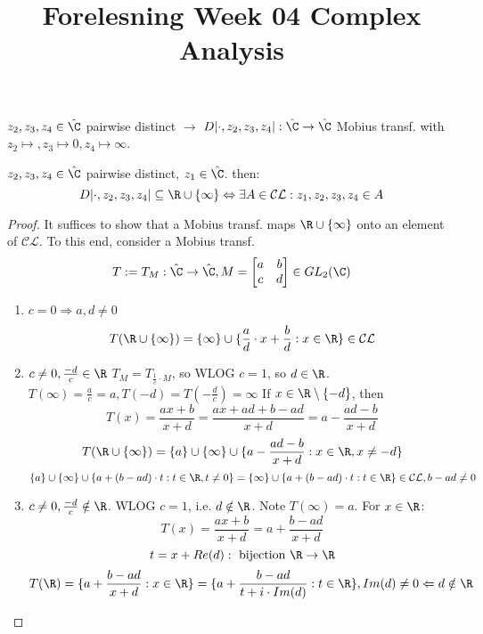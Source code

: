 \title{Forelesning Week 04 Complex Analysis}
\maketitle
\begin{recall}
  $z_2,z_3,z_4 \in \hat{\C}$ pairwise distinct $\rightarrow$ $D| \cdot,z_2,z_3,z_4|:\hat{\C}\to \hat{\C}$ Mobius transf. with $z_2\mapsto, z_3\mapsto 0,z_4\mapsto \infty$.
\end{recall}

\begin{proposition}
  $z_2,z_3,z_4 \in \hat{\C}$ pairwise distinct, $z_1\in \hat{\C}$. then:
      $$D| \cdot,z_2,z_3,z_4| \subseteq \R\cup\{\infty\} \Leftrightarrow \exists A\in \mathcal{CL}: z_1,z_2,z_3,z_4\in A$$
\end{proposition}
\begin{proof}
  It suffices to show that a Mobius transf. maps $\R\cup\{\infty\}$ onto an element of $\mathcal{CL}$. To this end, consider a Mobius transf.
    $$T:=T_M:\hat{\C}\to \hat{\C}, M=
\begin{bmatrix}
    a & b \\
    c & d
\end{bmatrix}
    \in GL_2(\C)$$
\begin{enumerate}[Case (1)]
  \item $c=0 \Rightarrow a,d \neq 0$
    $$T(\R\cup\{\infty\})=\{\infty\}\cup \{\frac{a}{d} \cdot x+\frac{b}{d}: x\in \R\}\in \mathcal{CL}$$
  \item $c\neq 0, \frac{-d}{c}\in \R$ \newline
    $T_M=T_{\frac{1}{c} \cdot M}$, so WLOG $c=1$, so $d\in \R$.
    \newline $T(\infty)=\frac{a}{c}=a, T(-d)=T(-\frac{d}{c})=\infty$
    \newline If $x\in \R\setminus\{-d\}$, then
      $$T(x)=\frac{ax+b}{x+d}=\frac{ax+ad+b-ad}{x+d}=a-\frac{ad-b}{x+d}$$
    $$T(\R\cup\{\infty\})=\{a\}\cup\{\infty\}\cup\{a-\frac{ad-b}{x+d}:x\in\R,x\neq -d\}$$
    $$\{a\}\cup\{\infty\}\cup\{a+(b-ad) \cdot t:t\in \R, t\neq 0\}=\{\infty\}\cup\{a+(b-ad) \cdot t:t\in \R\}\in \mathcal{CL}, b-ad\neq 0$$
  \item $c\neq 0, \frac{-d}{c}\notin \R$.
  \newline WLOG $c=1$, i.e. $d\notin \R$. Note $T(\infty)=a$. For $x\in \R$:
    $$T(x)=\frac{ax+b}{x+d}=a+\frac{b-ad}{x+d}$$
    $$t=x+Re(d): \text{ bijection }\R\to\R$$
    $$T(\R)=\{a+\frac{b-ad}{x+d}:x\in \R\}=\{a+\frac{b-ad}{t+i \cdot Im(d)}: t\in \R\}, Im(d)\neq 0 \Leftarrow d\notin \R$$

\end{enumerate}
\end{proof}
